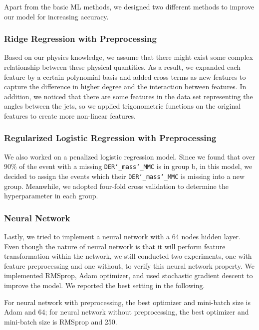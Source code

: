 \documentclass[10pt,conference,compsocconf]{IEEEtran}
\begin{document}
Apart from the basic ML methods, we designed two different methods to improve our model for increasing accuracy.

\subsubsection{Ridge Regression with Preprocessing} \hfill

Based on our physics knowledge, we assume that there might exist some complex relationship between these physical quantities. As a result, we expanded each feature by a certain polynomial basis and added cross terms as new features to capture the difference in higher degree and the interaction between features. In addition, we noticed that there are some features in the data set representing the angles between the jets, so we applied trigonometric functions on the original features to create more non-linear features.

\subsubsection{Regularized Logistic Regression with Preprocessing} \hfill

We also worked on a penalized logistic regression model. Since we found that over 90\% of the event with a missing \texttt{DER\char`_mass\char`_MMC} is in group b, in this model, we decided to assign the events which their \texttt{DER\char`_mass\char`_MMC} is missing into a new group. Meanwhile, we adopted four-fold cross validation to determine the hyperparameter in each group.


\subsubsection{Neural Network} \hfill

Lastly, we tried to implement a neural network with a 64 nodes hidden layer. Even though the nature of neural network is that it will perform feature transformation within the network, we still conducted two experiments, one with feature preprocessing and one without, to verify this neural network property. We implemented RMSprop, Adam optimizer, and used stochastic gradient descent to improve the model. We reported the best setting in the following.

For neural network with preprocessing, the best optimizer and mini-batch size is Adam and 64; for neural network without preprocessing, the best optimizer and mini-batch size is RMSprop and 250.
\end{document}
